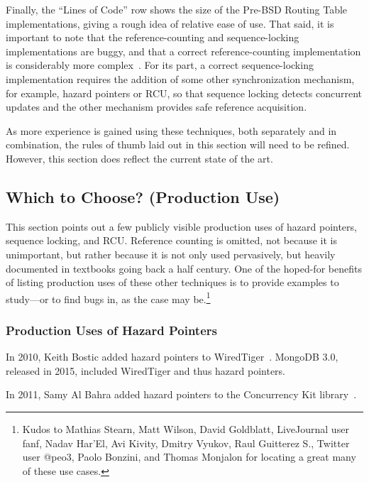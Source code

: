 Finally, the ``Lines of Code'' row shows the size of the Pre-BSD
Routing Table implementations, giving a rough idea of relative ease of use.
That said, it is important to note that the reference-counting and
sequence-locking implementations are buggy, and that a correct
reference-counting implementation is considerably
more complex~\cite{Valois95a,MagedMichael95a}.
For its part, a correct sequence-locking implementation requires
the addition of some other synchronization mechanism, for example,
hazard pointers or RCU, so that sequence locking detects concurrent
updates and the other mechanism provides safe reference acquisition.

As more experience is gained using these techniques, both separately
and in combination, the rules of thumb laid out in this section will
need to be refined.
However, this section does reflect the current state of the art.

\subsection{Which to Choose?
			     (Production Use)}
\label{sec:defer:Which to Choose? (Production Use)}

This section points out a few publicly visible production uses of
hazard pointers, sequence locking, and RCU\@.
Reference counting is omitted, not because it is unimportant, but rather
because it is not only used pervasively, but heavily documented in textbooks
going back a half century.
One of the hoped-for benefits of listing production uses of these other
techniques is to provide examples to study---or to find bugs in, as
the case may be.\footnote{
	Kudos to Mathias Stearn, Matt Wilson, David Goldblatt, LiveJournal
	user fanf, Nadav Har'El, Avi Kivity, Dmitry Vyukov, Raul Guitterez
	S., Twitter user @peo3, Paolo Bonzini, and Thomas Monjalon for
	locating a great many of these use cases.}

\subsubsection{Production Uses of Hazard Pointers}
\label{sec:defer:Production Uses of Hazard Pointers}

In 2010, Keith Bostic added hazard pointers to
WiredTiger~\cite{KeithBostic2010WiredTigerhazptr}.
MongoDB 3.0, released in 2015, included WiredTiger and thus hazard pointers.

In 2011, Samy Al Bahra added hazard pointers to the Concurrency Kit
library~\cite{SamyAlBahra2011ckhp}.

